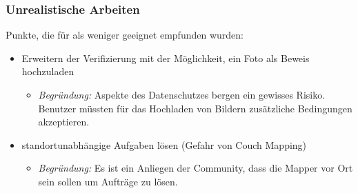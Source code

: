 \subsubsection{Unrealistische Arbeiten}
Punkte, die für \kort{} als weniger geeignet empfunden wurden:

\begin{itemize}
	\item Erweitern der Verifizierung mit der Möglichkeit, ein Foto als Beweis hochzuladen
	\begin{itemize}
	  \item \emph{Begründung:} Aspekte des Datenschutzes bergen ein gewisses Risiko. Benutzer müssten für das Hochladen von Bildern zusätzliche Bedingungen akzeptieren.
	\end{itemize}
	\item standortunabhängige Aufgaben lösen (Gefahr von Couch Mapping)
	\begin{itemize}
	  \item \emph{Begründung:} Es ist ein Anliegen der  Community, dass die Mapper vor Ort sein sollen um Aufträge zu lösen. 
	\end{itemize}
\end{itemize}
